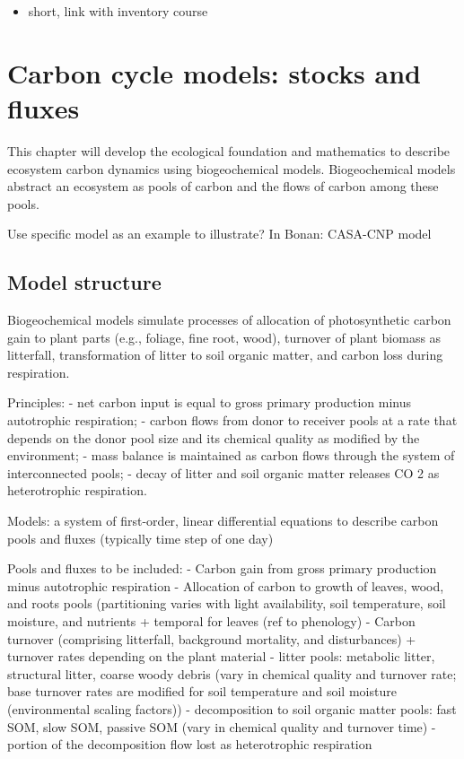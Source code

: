 \documentclass[
  oneside]{book}
\providecommand{\tightlist}{%
  \setlength{\itemsep}{0pt}\setlength{\parskip}{0pt}}
\begin{document}
\begin{itemize}
\tightlist
\item
  short, link with inventory course
\end{itemize}

\hypertarget{carbon-cycle-models-stocks-and-fluxes}{%
\section{Carbon cycle models: stocks and fluxes}\label{carbon-cycle-models-stocks-and-fluxes}}

This chapter will develop the ecological foundation and mathematics to describe ecosystem carbon dynamics using biogeochemical models.
Biogeochemical models abstract an ecosystem as pools of carbon and the flows of carbon among these pools.

Use specific model as an example to illustrate? In Bonan: CASA-CNP model

\hypertarget{model-structure}{%
\subsection{Model structure}\label{model-structure}}

Biogeochemical models simulate processes of allocation of photosynthetic carbon gain to plant parts (e.g., foliage, fine root, wood), turnover of plant biomass as litterfall, transformation of litter to soil organic matter, and carbon loss during respiration.

Principles:
- net carbon input is equal to gross primary production minus autotrophic respiration;
- carbon flows from donor to receiver pools at a rate that depends on the donor pool size and its chemical quality as modified by the environment;
- mass balance is maintained as carbon flows through the system of interconnected pools;
- decay of litter and soil organic matter releases CO 2 as heterotrophic respiration.

Models:
a system of first-order, linear differential equations to describe carbon pools and fluxes (typically time step of one day)

Pools and fluxes to be included:
- Carbon gain from gross primary production minus autotrophic respiration
- Allocation of carbon to growth of leaves, wood, and roots pools (partitioning varies with light availability, soil temperature, soil moisture, and nutrients + temporal for leaves (ref to phenology)
- Carbon turnover (comprising litterfall, background mortality, and disturbances) + turnover rates depending on the plant material
- litter pools: metabolic litter, structural litter, coarse woody debris (vary in chemical quality and turnover rate; base turnover rates are modified for soil temperature and soil moisture (environmental scaling factors))
- decomposition to soil organic matter pools: fast SOM, slow SOM, passive SOM (vary in chemical quality and turnover time)
- portion of the decomposition flow lost as heterotrophic respiration
\end{document}
